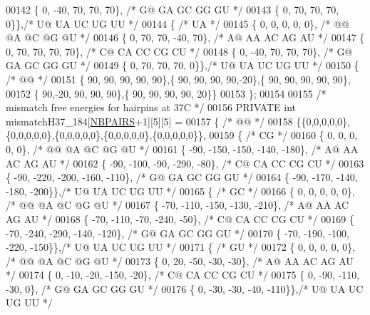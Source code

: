 \begin{DoxyCode}
00142    \{   0,  -40,   70,   70,   70\}, \textcolor{comment}{/* G@  GA  GC  GG  GU */}
00143    \{   0,   70,   70,   70,    0\}\},\textcolor{comment}{/* U@  UA  UC  UG  UU */}
00144   \{ \textcolor{comment}{/* UA */}
00145    \{   0,    0,    0,    0,    0\}, \textcolor{comment}{/* @@  @A  @C  @G  @U */}
00146    \{   0,   70,   70,  -40,   70\}, \textcolor{comment}{/* A@  AA  AC  AG  AU */}
00147    \{   0,   70,   70,   70,   70\}, \textcolor{comment}{/* C@  CA  CC  CG  CU */}
00148    \{   0,  -40,   70,   70,   70\}, \textcolor{comment}{/* G@  GA  GC  GG  GU */}
00149    \{   0,   70,   70,   70,    0\}\},\textcolor{comment}{/* U@  UA  UC  UG  UU */}
00150   \{ \textcolor{comment}{/* @@ */}
00151    \{ 90, 90, 90, 90, 90\},\{ 90, 90, 90, 90,-20\},\{ 90, 90, 90, 90, 90\},
00152    \{ 90,-20, 90, 90, 90\},\{ 90, 90, 90, 90, 20\}\}
00153 \};
00154 
00155 \textcolor{comment}{/* mismatch free energies for hairpins at 37C */}
00156 PRIVATE \textcolor{keywordtype}{int} mismatchH37\_184[\hyperlink{energy__const_8h_a5e75221c779d618eab81e096f37e32ce}{NBPAIRS}+1][5][5] =
00157 \{ \textcolor{comment}{/* @@ */}
00158   \{\{0,0,0,0,0\},\{0,0,0,0,0\},\{0,0,0,0,0\},\{0,0,0,0,0\},\{0,0,0,0,0\}\},
00159   \{ \textcolor{comment}{/* CG */}
00160    \{   0,    0,    0,    0,    0\}, \textcolor{comment}{/* @@  @A  @C  @G  @U */}
00161    \{ -90, -150, -150, -140, -180\}, \textcolor{comment}{/* A@  AA  AC  AG  AU */}
00162    \{ -90, -100,  -90, -290,  -80\}, \textcolor{comment}{/* C@  CA  CC  CG  CU */}
00163    \{ -90, -220, -200, -160, -110\}, \textcolor{comment}{/* G@  GA  GC  GG  GU */}
00164    \{ -90, -170, -140, -180, -200\}\},\textcolor{comment}{/* U@  UA  UC  UG  UU */}
00165   \{ \textcolor{comment}{/* GC */}
00166    \{   0,    0,    0,    0,    0\}, \textcolor{comment}{/* @@  @A  @C  @G  @U */}
00167    \{ -70, -110, -150, -130, -210\}, \textcolor{comment}{/* A@  AA  AC  AG  AU */}
00168    \{ -70, -110,  -70, -240,  -50\}, \textcolor{comment}{/* C@  CA  CC  CG  CU */}
00169    \{ -70, -240, -290, -140, -120\}, \textcolor{comment}{/* G@  GA  GC  GG  GU */}
00170    \{ -70, -190, -100, -220, -150\}\},\textcolor{comment}{/* U@  UA  UC  UG  UU */}
00171   \{ \textcolor{comment}{/* GU */}
00172    \{   0,    0,    0,    0,    0\}, \textcolor{comment}{/* @@  @A  @C  @G  @U */}
00173    \{   0,   20,  -50,  -30,  -30\}, \textcolor{comment}{/* A@  AA  AC  AG  AU */}
00174    \{   0,  -10,  -20, -150,  -20\}, \textcolor{comment}{/* C@  CA  CC  CG  CU */}
00175    \{   0,  -90, -110,  -30,    0\}, \textcolor{comment}{/* G@  GA  GC  GG  GU */}
00176    \{   0,  -30,  -30,  -40, -110\}\},\textcolor{comment}{/* U@  UA  UC  UG  UU */}

\end{DoxyCode}
